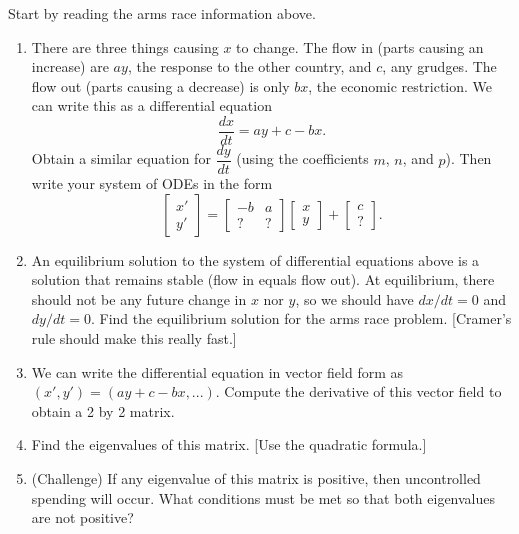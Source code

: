 {\begin{problem}
Start by reading the arms race information above.
\begin{enumerate}
 \item There are three things causing $x$ to change. The flow in (parts causing an increase) are $ay$, the response to the other country, and $c$, any grudges.  The flow out (parts causing a decrease) is only $bx$, the economic restriction.  We can write this as a differential equation $$\frac{dx}{dt} = ay+c-bx.$$ Obtain a similar equation for $\dfrac{dy}{dt}$ (using the coefficients $m$, $n$, and $p$). Then write your system of ODEs in the form 
$$
\begin{bmatrix}x'\\y'\end{bmatrix}
=
\begin{bmatrix}-b&a\\?&?\end{bmatrix}
\begin{bmatrix}x\\y\end{bmatrix}
+
\begin{bmatrix}c\\?\end{bmatrix}.
$$ 
 \item An equilibrium solution to the system of differential equations above is a solution that remains stable (flow in equals flow out). At equilibrium, there should not be any future change in $x$ nor $y$, so we should have $dx/dt=0$ and $dy/dt=0$. Find the equilibrium solution for the arms race problem. [Cramer's rule should make this really fast.]
 \item We can write the differential equation in vector field form as $(x',y') = (ay+c-bx,...)$.  Compute the derivative of this vector field to obtain a 2 by 2 matrix.  
 \item Find the eigenvalues of this matrix. [Use the quadratic formula.] 
 \item (Challenge) If any eigenvalue of this matrix is positive, then uncontrolled spending will occur. What conditions must be met so that both eigenvalues are not positive?
\end{enumerate}
\end{problem}

}







